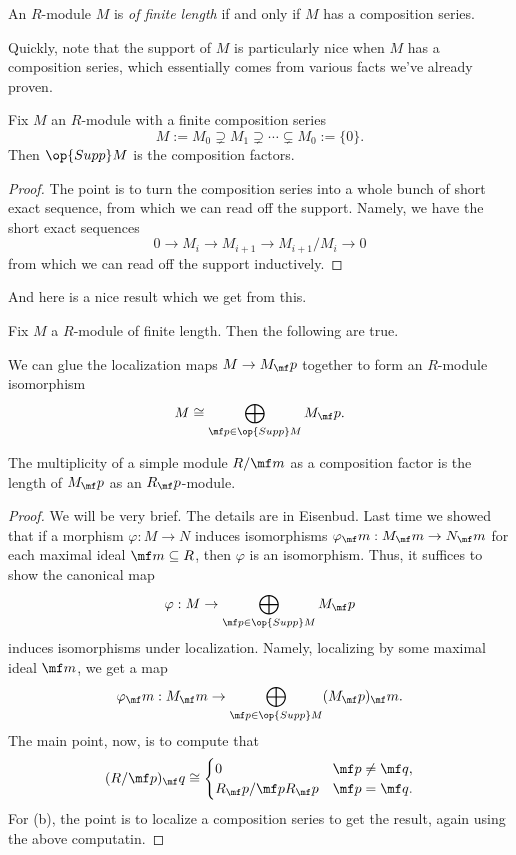 \begin{definition}
	An $R$-module $M$ is \textit{of finite length} if and only if $M$ has a composition series.
\end{definition}
Quickly, note that the support of $M$ is particularly nice when $M$ has a composition series, which essentially comes from various facts we've already proven.
\begin{lemma}
	Fix $M$ an $R$-module with a finite composition series
	\[M:=M_0\supsetneq M_1\supsetneq\cdots\subsetneq M_0:=\{0\}.\]
	Then $\op{Supp}M$ is the composition factors.
\end{lemma}
\begin{proof}
	The point is to turn the composition series into a whole bunch of short exact sequence, from which we can read off the support. Namely, we have the short exact sequences
	\[0\to M_i\to M_{i+1}\to M_{i+1}/M_i\to0\]
	from which we can read off the support inductively.
\end{proof}
And here is a nice result which we get from this.
\begin{theorem}
	Fix $M$ a $R$-module of finite length. Then the following are true.
	\begin{listalph}
		\item We can glue the localization maps $M\to M_\mf p$ together to form an $R$-module isomorphism
		\[M\cong\bigoplus_{\mf p\in\op{Supp}M}M_\mf p.\]
		\item The multiplicity of a simple module $R/\mf m$ as a composition factor is the length of $M_\mf p$ as an $R_\mf p$-module.
	\end{listalph}
\end{theorem}
\begin{proof}
	We will be very brief. The details are in Eisenbud. Last time we showed that if a morphism $\varphi:M\to N$ induces isomorphisms $\varphi_\mf m:M_\mf m\to N_\mf m$ for each maximal ideal $\mf m\subseteq R$, then $\varphi$ is an isomorphism. Thus, it suffices to show the canonical map
	\[\varphi:M\to\bigoplus_{\mf p\in\op{Supp}M}M_\mf p\]
	induces isomorphisms under localization. Namely, localizing by some maximal ideal $\mf m$, we get a map
	\[\varphi_\mf m:M_\mf m\to\bigoplus_{\mf p\in\op{Supp}M}(M_\mf p)_\mf m.\]
	The main point, now, is to compute that
	\[(R/\mf p)_\mf q\cong\begin{cases}
		0 & \mf p\ne\mf q, \\
		R_\mf p/\mf pR_\mf p & \mf p=\mf q.
	\end{cases}\]
	For (b), the point is to localize a composition series to get the result, again using the above computatin.
\end{proof}

